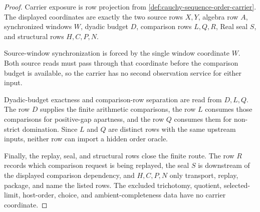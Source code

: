 \begin{proof}
Carrier exposure is row projection from \autoref{def:cauchy-sequence-order-carrier}. The displayed coordinates are exactly the two source rows $X,Y$, algebra row $A$, synchronized windows $W$, dyadic budget $D$, comparison rows $L,Q,R$, Real seal $S$, and structural rows $H,C,P,N$.

Source-window synchronization is forced by the single window coordinate $W$. Both source reads must pass through that coordinate before the comparison budget is available, so the carrier has no second observation service for either input.

Dyadic-budget exactness and comparison-row separation are read from $D,L,Q$. The row $D$ supplies the finite arithmetic comparisons, the row $L$ consumes those comparisons for positive-gap apartness, and the row $Q$ consumes them for non-strict domination. Since $L$ and $Q$ are distinct rows with the same upstream inputs, neither row can import a hidden order oracle.

Finally, the replay, seal, and structural rows close the finite route. The row $R$ records which comparison request is being replayed, the seal $S$ is downstream of the displayed comparison dependency, and $H,C,P,N$ only transport, replay, package, and name the listed rows. The excluded trichotomy, quotient, selected-limit, host-order, choice, and ambient-completeness data have no carrier coordinate.
\end{proof}

